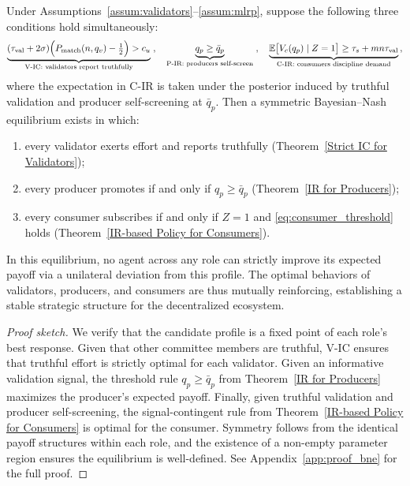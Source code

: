 \begin{theorem}
\label{Symmetric Bayesian Nash Equilibrium}
Under Assumptions~\ref{assum:validators}--\ref{assum:mlrp}, suppose the following three conditions hold simultaneously:
\begin{equation}
\label{eq:bne}
\underbrace{(\tau_{\text{val}} + 2\sigma)\Big(P_{\text{match}}(n, q_v) - \tfrac{1}{2}\Big) > c_u}_{\text{\normalfont V-IC: validators report truthfully}}\;,\quad
\underbrace{q_p \geq \bar{q}_p}_{\text{\normalfont P-IR: producers self-screen}}\;,\quad
\underbrace{\mathbb{E}\bigl[V_c(q_p) \mid Z = 1\bigr] \geq \tau_s + mn\tau_{\text{val}}}_{\text{\normalfont C-IR: consumers discipline demand}}\,,
\end{equation}
where the expectation in C-IR is taken under the posterior induced by truthful validation and producer self-screening at $\bar{q}_p$. Then a symmetric Bayesian--Nash equilibrium exists in which:
\begin{enumerate}[leftmargin=2em]
    \item every validator exerts effort and reports truthfully (Theorem~\ref{Strict IC for Validators});
    \item every producer promotes if and only if $q_p \geq \bar{q}_p$ (Theorem~\ref{IR for Producers});
    \item every consumer subscribes if and only if $Z = 1$ and \eqref{eq:consumer_threshold} holds (Theorem~\ref{IR-based Policy for Consumers}).
\end{enumerate}
In this equilibrium, no agent across any role can strictly improve its expected payoff via a unilateral deviation from this profile. The optimal behaviors of validators, producers, and consumers are thus mutually reinforcing, establishing a stable strategic structure for the decentralized ecosystem.
\end{theorem}

\begin{proof}[Proof sketch]
We verify that the candidate profile is a fixed point of each role's best response. Given that other committee members are truthful, V-IC ensures that truthful effort is strictly optimal for each validator. Given an informative validation signal, the threshold rule $q_p \geq \bar{q}_p$ from Theorem~\ref{IR for Producers} maximizes the producer's expected payoff. Finally, given truthful validation and producer self-screening, the signal-contingent rule from Theorem~\ref{IR-based Policy for Consumers} is optimal for the consumer. Symmetry follows from the identical payoff structures within each role, and the existence of a non-empty parameter region ensures the equilibrium is well-defined. See Appendix~\ref{app:proof_bne} for the full proof.
\end{proof}

